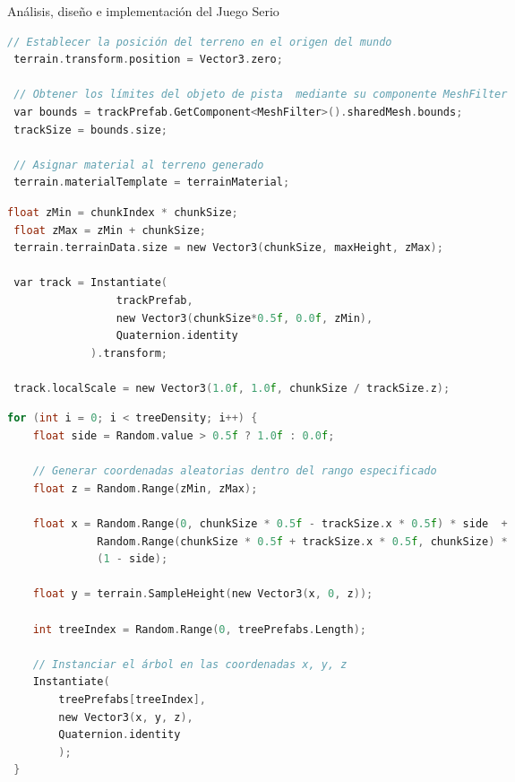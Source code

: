 \begin{thesischapter}{2} {Análisis, diseño e implementación del Juego Serio}
\begin{center}
\begin{minipage}{0.8\textwidth}
\begin{lstlisting}[language=c, caption={Generar terreno},label={hola}]
 // Establecer la posición del terreno en el origen del mundo
 terrain.transform.position = Vector3.zero;     

 // Obtener los límites del objeto de pista  mediante su componente MeshFilter           
 var bounds = trackPrefab.GetComponent<MeshFilter>().sharedMesh.bounds;
 trackSize = bounds.size;
 
 // Asignar material al terreno generado
 terrain.materialTemplate = terrainMaterial;
\end{lstlisting}
\end{minipage}  
\end{center}

\begin{center}
\begin{minipage}{0.8\textwidth}
\begin{lstlisting}[language=c, caption={Generar pista},label={hola}]
 float zMin = chunkIndex * chunkSize;
 float zMax = zMin + chunkSize;
 terrain.terrainData.size = new Vector3(chunkSize, maxHeight, zMax);

 var track = Instantiate(
                 trackPrefab, 
                 new Vector3(chunkSize*0.5f, 0.0f, zMin), 
                 Quaternion.identity
             ).transform;

 track.localScale = new Vector3(1.0f, 1.0f, chunkSize / trackSize.z);
\end{lstlisting}
\end{minipage}  
\end{center}

\begin{center}
\begin{minipage}{0.8\textwidth}
\begin{lstlisting}[language=c, caption={Posicionar árboles},label={hola}]    
 for (int i = 0; i < treeDensity; i++) {
    float side = Random.value > 0.5f ? 1.0f : 0.0f;

    // Generar coordenadas aleatorias dentro del rango especificado
    float z = Random.Range(zMin, zMax);  

    float x = Random.Range(0, chunkSize * 0.5f - trackSize.x * 0.5f) * side  +
              Random.Range(chunkSize * 0.5f + trackSize.x * 0.5f, chunkSize) * 
              (1 - side);

    float y = terrain.SampleHeight(new Vector3(x, 0, z)); 

    int treeIndex = Random.Range(0, treePrefabs.Length);
    
    // Instanciar el árbol en las coordenadas x, y, z 
    Instantiate(
        treePrefabs[treeIndex], 
        new Vector3(x, y, z), 
        Quaternion.identity
        );
 }


\end{lstlisting}
\end{minipage}
\end{center}
\end{thesischapter}
